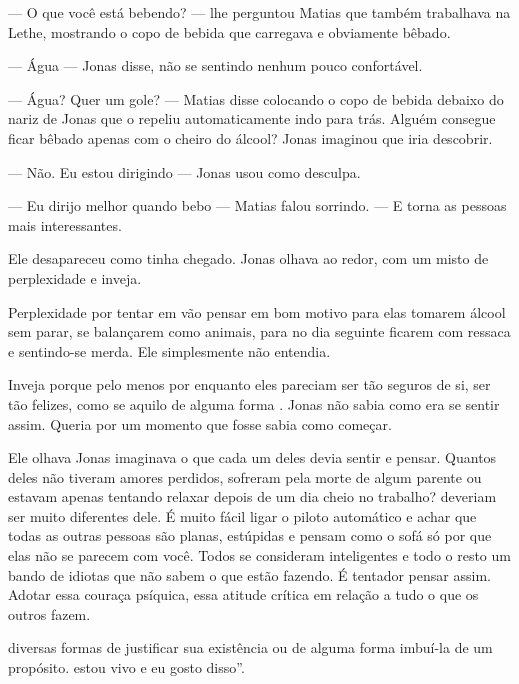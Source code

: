 --- O que você está bebendo? --- lhe perguntou Matias que também trabalhava na Lethe, mostrando o copo de bebida que carregava e obviamente bêbado.

--- Água --- Jonas disse, não se sentindo nenhum pouco confortável.

--- Água? Quer um gole? --- Matias disse colocando o copo de bebida debaixo do nariz de Jonas que o repeliu automaticamente indo para trás. Alguém consegue ficar bêbado apenas com o cheiro do álcool? Jonas imaginou que iria descobrir.

--- Não. Eu estou dirigindo --- Jonas usou como desculpa.

--- Eu dirijo melhor quando bebo --- Matias falou sorrindo. --- E torna as pessoas mais interessantes.

Ele desapareceu como tinha chegado. Jonas olhava ao redor, com um misto de perplexidade e inveja.

Perplexidade\mudanca{,} por tentar em vão pensar em bom motivo para elas tomarem álcool sem parar, se balançarem como animais, para no dia seguinte ficarem com ressaca e sentindo-se  merda. Ele simplesmente não entendia.

Inveja\mudanca{,} porque\mudanca{,} pelo menos por enquanto\mudanca{,} eles pareciam ser tão seguros de si, ser tão felizes, como se aquilo de alguma forma . Jonas não sabia como era se sentir assim. Queria por um momento que fosse  sabia como começar.

Ele olhava  Jonas imaginava o que cada um deles devia sentir e pensar. Quantos deles não tiveram amores perdidos, sofreram pela morte de algum parente ou estavam apenas tentando relaxar depois de um dia cheio no trabalho?  deveriam ser muito diferentes dele. É muito fácil ligar o piloto automático e achar que todas as outras pessoas são planas, estúpidas e pensam como o sofá só por que elas não se parecem com você. Todos se consideram inteligentes e todo o resto um bando de idiotas que não sabem o que estão fazendo. É tentador  pensar assim. Adotar essa couraça psíquica, essa atitude crítica em relação a tudo o que os outros fazem.

 diversas formas de justificar sua existência ou de alguma forma imbuí-la de um propósito.  estou vivo e eu gosto disso''.

